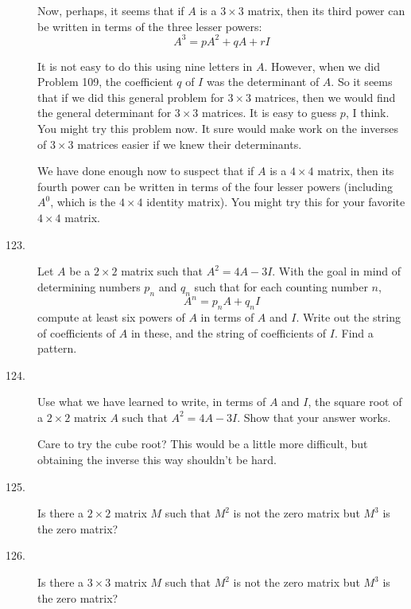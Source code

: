 \documentclass{article}
\begin{document}
\begin{description}
  \item[] Now, perhaps, it seems that if $A$ is a $3 \times 3$ matrix, then its third power can be written in terms of the three lesser powers:
    \begin{equation*}
    A^3 = pA^2 + qA + rI
    \end{equation*}

  \item[] It is not easy to do this using nine letters in $A$. However, when we did Problem 109, the coefficient $q$ of $I$ was the determinant of $A$. So it seems that if we did this general problem for $3 \times 3$ matrices, then we would find the general determinant for $3 \times 3$ matrices. It is easy to guess $p$, I think. You might try this problem now. It sure would make work on the inverses of $3 \times 3$ matrices easier if we knew their determinants.

  \item[] We have done enough now to suspect that if $A$ is a $4 \times 4$ matrix, then its fourth power can be written in terms of the four lesser powers (including $A^0$, which is the $4 \times 4$ identity matrix). You might try this for your favorite $4 \times 4$ matrix.

  \item[123.] Let $A$ be a $2 \times 2$ matrix such that $A^2 = 4A - 3I$. With the goal in mind of determining numbers $p_n$ and $q_n$ such that for each counting number $n$,
    \begin{equation*}
    A^n = p_n A + q_n I
    \end{equation*}
    compute at least six powers of $A$ in terms of $A$ and $I$. Write out the string of coefficients of $A$ in these, and the string of coefficients of $I$. Find a pattern.

  \item[124.] Use what we have learned to write, in terms of $A$ and $I$, the square root of a $2 \times 2$ matrix $A$ such that $A^2 = 4A - 3I$. Show that your answer works.

  \item[] Care to try the cube root? This would be a little more difficult, but obtaining the inverse this way shouldn't be hard.

  \item[125.] Is there a $2 \times 2$ matrix $M$ such that $M^2$ is not the zero matrix but $M^3$ is the zero matrix?

  \item[126.] Is there a $3 \times 3$ matrix $M$ such that $M^2$ is not the zero matrix but $M^3$ is the zero matrix?

\end{description}
\end{document}
